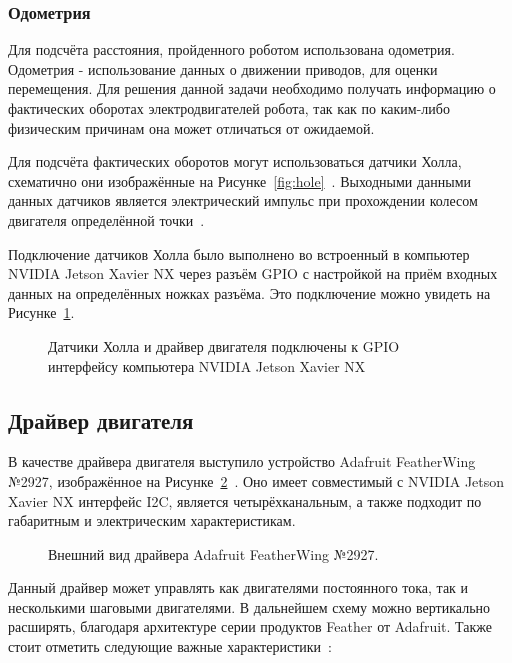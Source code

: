 \subsubsection{Одометрия} \label{sec:odom}
Для подсчёта расстояния, пройденного роботом использована одометрия. Одометрия - использование данных о движении приводов, для оценки перемещения.
Для решения данной задачи необходимо получать информацию о фактических оборотах электродвигателей робота, так как по каким-либо физическим причинам она может отличаться от ожидаемой.

Для подсчёта фактических оборотов могут использоваться датчики Холла, схематично они изображённые на Рисунке~\cref{fig:hole}~\cite{hole}. Выходными данными данных датчиков является электрический импульс при прохождении колесом двигателя определённой точки~\cite[с. 265]{hole-book}.

Подключение датчиков Холла было выполнено во встроенный в компьютер NVIDIA Jetson Xavier NX через разъём GPIO с настройкой на приём входных данных на определённых ножках разъёма. Это подключение можно увидеть на Рисунке~\cref{fig:gpio-wire}.

\begin{figure}[ht]
    \caption{Датчики Холла и драйвер двигателя подключены к GPIO интерфейсу компьютера NVIDIA Jetson Xavier NX}\label{fig:gpio-wire}
\end{figure}

\subsection{Драйвер двигателя}
В качестве драйвера двигателя выступило устройство Adafruit FeatherWing №2927, изображённое на Рисунке~\cref{fig:adafruit}~\cite{adafruit}. Оно имеет совместимый с NVIDIA Jetson Xavier NX интерфейс I2C, является четырёхканальным, а также подходит по габаритным и электрическим характеристикам.

\begin{figure}[ht]
    \caption{Внешний вид драйвера Adafruit FeatherWing №2927.}\label{fig:adafruit}
\end{figure}

Данный драйвер может управлять как двигателями постоянного тока, так и несколькими шаговыми двигателями. В дальнейшем схему можно вертикально расширять, благодаря архитектуре серии продуктов Feather от Adafruit. Также стоит отметить следующие важные характеристики~\cite{adafruit}:

